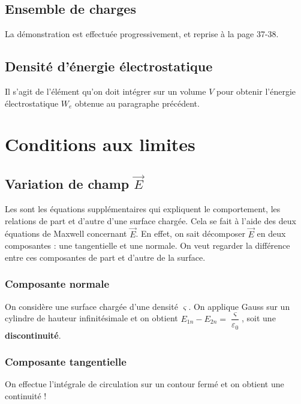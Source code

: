 \documentclass[12pt]{book}
\begin{document}
\subsection{Ensemble de charges}
La démonstration est effectuée progressivement, et reprise à la page 37-38.
\subsection{Densité d'énergie électrostatique}
Il s'agit de l'élément qu'on doit intégrer sur un volume $V$ pour obtenir l'énergie électrostatique $W_e$ obtenue au paragraphe précédent.

\section{Conditions aux limites}
\subsection{Variation de champ $\vec{E}$}
Les  sont les équations supplémentaires qui expliquent le comportement, les relations de part et d'autre d'une surface chargée. Cela se fait à l'aide des deux équations de Maxwell concernant $\vec{E}$. En effet, on sait décomposer $\vec{E}$ en deux composantes : une tangentielle et une normale. On veut regarder la différence entre ces composantes de part et d'autre de la surface. 
\subsubsection{Composante normale}
On considère une surface chargée d'une densité $\varsigma$.
On applique Gauss sur un cylindre de hauteur infinitésimale et on obtient $E_{1n} - E_{2n} = \dfrac{\varsigma}{\varepsilon_0}$, soit une \textbf{discontinuité}.

\subsubsection{Composante tangentielle}
On effectue l'intégrale de circulation sur un contour fermé et on obtient une continuité !

\end{document}
